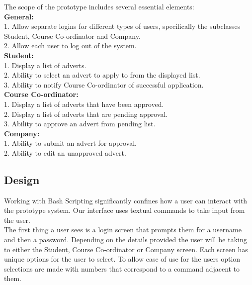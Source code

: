 \documentclass{l3deliverable}
\begin{document}
The scope of the prototype includes several essential elements:\\

\textbf{General:}\\

1. Allow separate logins for different types of users, specifically the subclasses Student, Course Co-ordinator and Company.\\
2. Allow each user to log out of the system. \\

\textbf{Student:}\\

1. Display a list of adverts.\\
2. Ability to select an advert to apply to from the displayed list.\\
3. Ability to notify Course Co-ordinator of successful application.\\

\textbf{Course Co-ordinator:}\\

1. Display a list of adverts that have been approved.\\
2. Display a list of adverts that are pending approval.\\
3. Ability to approve an advert from pending list.\\
 
\textbf{Company:}\\

1. Ability to submit an advert for approval.\\
2. Ability to edit an unapproved advert.\\

\subsection{Design}

Working with Bash Scripting significantly confines how a user can interact with the prototype system. Our interface uses textual commands to take input from the user. \\

The first thing a user sees is a login screen that prompts them for a username and then a password. Depending on the details provided the user will be taking to either the Student, Course Co-ordinator or Company screen. Each screen has unique options for the user to select. To allow ease of use for the users option selections are made with numbers that correspond to a command adjacent to them.  
\end{document}
